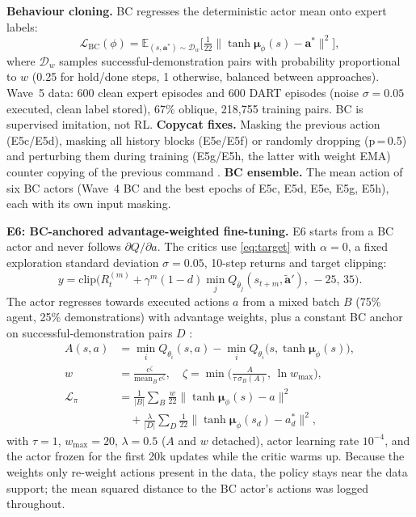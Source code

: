 \documentclass[conference,10pt]{IEEEtran}
\begin{document}
\textbf{Behaviour cloning.} BC \cite{pomerleau1989alvinn} regresses the deterministic actor mean onto expert labels:
\begin{equation}
\mathcal L_{\text{BC}}(\phi)=\mathbb E_{(s,\bm a^{*})\sim\mathcal D_w}\Big[\tfrac{1}{22}\big\lVert\tanh\bm\mu_\phi(s)-\bm a^{*}\big\rVert^{2}\Big],\label{eq:bc}
\end{equation}
where $\mathcal D_w$ samples successful-demonstration pairs with probability proportional to $w$ (0.25 for hold/done steps,
1 otherwise, balanced between approaches). Wave~5 data: 600 clean expert episodes and 600 DART episodes \cite{laskey2017dart}
(noise $\sigma=0.05$ executed, clean label stored), 67\% oblique, 218{,}755 training pairs. BC is supervised imitation, not RL.
\textbf{Copycat fixes.} Masking the previous action (E5c/E5d), masking all history blocks (E5e/E5f) or randomly dropping
(p\,=\,0.5) and perturbing them during training (E5g/E5h, the latter with weight EMA) counter copying of the previous command
\cite{wen2020copycat,dehaan2019causal}. \textbf{BC ensemble.} The mean action of six BC actors (Wave~4 BC and the best epochs
of E5c, E5d, E5e, E5g, E5h), each with its own input masking.

\textbf{E6: BC-anchored advantage-weighted fine-tuning.} E6 starts from a BC actor and never follows $\partial Q/\partial a$.
The critics use \eqref{eq:target} with $\alpha=0$, a fixed exploration standard deviation $\sigma=0.05$, 10-step returns and
target clipping:
\begin{equation}
y=\mathrm{clip}\Big(R^{(m)}_t+\gamma^{m}(1-d)\min_j Q_{\bar\theta_j}(s_{t+m},\tilde{\bm a}'),\,-25,\,35\Big).
\end{equation}
The actor regresses towards executed actions $a$ from a mixed batch $B$ (75\% agent, 25\% demonstrations) with
advantage weights, plus a constant BC anchor on successful-demonstration pairs $D$ \cite{peng2019awr,nair2020awac,fujimoto2021td3bc}:
\begin{align}
A(s,a)&=\min_i Q_{\theta_i}(s,a)-\min_i Q_{\theta_i}\big(s,\tanh\bm\mu_\phi(s)\big),\\
w&=\frac{e^{\zeta}}{\mathrm{mean}_B\,e^{\zeta}},\quad \zeta=\min\!\Big(\frac{A}{\tau\,\sigma_B(A)},\,\ln w_{\max}\Big),\\
\mathcal L_\pi&=\frac{1}{|B|}\sum_{B}\frac{w}{22}\lVert\tanh\bm\mu_\phi(s)-a\rVert^{2}\nonumber\\
&\quad+\frac{\lambda}{|D|}\sum_{D}\frac{1}{22}\lVert\tanh\bm\mu_\phi(s_d)-a^{*}_d\rVert^{2},\label{eq:e6}
\end{align}
with $\tau=1$, $w_{\max}=20$, $\lambda=0.5$ ($A$ and $w$ detached), actor learning rate $10^{-4}$, and the actor frozen for
the first 20k updates while the critic warms up. Because the weights only re-weight actions present in the data, the policy
stays near the data support; the mean squared distance to the BC actor's actions was logged throughout.
\end{document}

